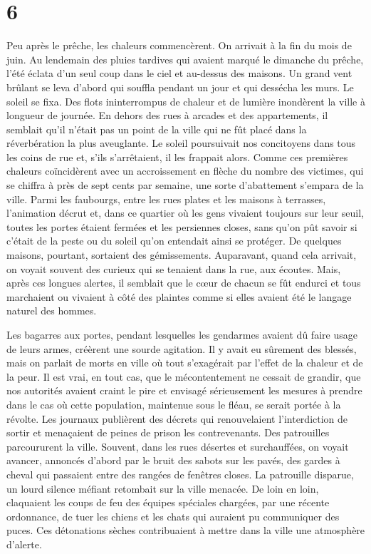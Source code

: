 \documentclass[french,twoside]{book} %
\begin{document}
\section[{6}]{6}
\noindent Peu après le prêche, les chaleurs commencèrent. On arrivait à la fin du mois de juin. Au lendemain des pluies tardives qui avaient marqué le dimanche du prêche, l’été éclata d’un seul coup dans le ciel et au-dessus des maisons. Un grand vent brûlant se leva d’abord qui souffla pendant un jour et qui dessécha les murs. Le soleil se fixa. Des flots ininterrompus de chaleur et de lumière inondèrent la ville à longueur de journée. En dehors des rues à arcades et des appartements, il semblait qu’il n’était pas un point de la ville qui ne fût placé dans la réverbération la plus aveuglante. Le soleil poursuivait nos concitoyens dans tous les coins de rue et, s’ils s’arrêtaient, il les frappait alors. Comme ces premières chaleurs coïncidèrent avec un accroissement en flèche du nombre des victimes, qui se chiffra à près de sept cents par semaine, une sorte d’abattement s’empara de la ville. Parmi les faubourgs, entre les rues plates et les maisons à terrasses, l’animation décrut et, dans ce quartier où les gens vivaient toujours sur leur seuil, toutes les portes étaient fermées et les persiennes closes, sans qu’on pût savoir si c’était de la peste ou du soleil qu’on entendait ainsi se protéger. De quelques maisons, pourtant, sortaient des gémissements. Auparavant, quand cela arrivait, on voyait souvent des curieux qui se tenaient dans la rue, aux écoutes. Mais, après ces longues alertes, il semblait que le cœur de chacun se fût endurci et tous marchaient ou vivaient à côté des plaintes comme si elles avaient été le langage naturel des hommes.\par
Les bagarres aux portes, pendant lesquelles les gendarmes avaient dû faire usage de leurs armes, créèrent une sourde agitation. Il y avait eu sûrement des blessés, mais on parlait de morts en ville où tout s’exagérait par l’effet de la chaleur et de la peur. Il est vrai, en tout cas, que le mécontentement ne cessait de grandir, que nos autorités avaient craint le pire et envisagé sérieusement les mesures à prendre dans le cas où cette population, maintenue sous le fléau, se serait portée à la révolte. Les journaux publièrent des décrets qui renouvelaient l’interdiction de sortir et menaçaient de peines de prison les contrevenants. Des patrouilles parcoururent la ville. Souvent, dans les rues désertes et surchauffées, on voyait avancer, annoncés d’abord par le bruit des sabots sur les pavés, des gardes à cheval qui passaient entre des rangées de fenêtres closes. La patrouille disparue, un lourd silence méfiant retombait sur la ville menacée. De loin en loin, claquaient les coups de feu des équipes spéciales chargées, par une récente ordonnance, de tuer les chiens et les chats qui auraient pu communiquer des puces. Ces détonations sèches contribuaient à mettre dans la ville une atmosphère d’alerte.\par
\end{document}
